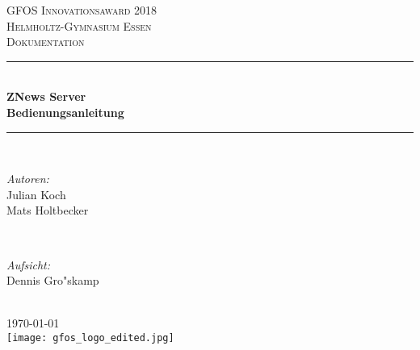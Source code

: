 \begin{titlepage}

    \newcommand{\HRule}{\rule{\linewidth}{0.5mm}} %

    \center %

    \textsc{\LARGE GFOS Innovationsaward 2018}\\[1.5cm]
    \textsc{\Large Helmholtz-Gymnasium Essen}\\[0.5cm]
    \textsc{\large Dokumentation}\\[0.5cm]

    \HRule \\[0.4cm]
    { \huge \bfseries ZNews Server\\ Bedienungsanleitung}\\[0.4cm]
    \HRule \\[1.5cm]

    \begin{minipage}{0.4\textwidth}
        \begin{flushleft}
            \large
            \emph{Autoren:}\\
            Julian Koch\\
            Mats Holtbecker
        \end{flushleft}
    \end{minipage}
    ~
    \begin{minipage}{0.4\textwidth}
        \begin{flushright}
            \large
            \emph{Aufsicht:} \\
            Dennis Gro"skamp\\
            \hfill
        \end{flushright}
    \end{minipage}\\[2cm]


    {\large \today}\\[2cm]

    \texttt{[image: gfos\_logo\_edited.jpg]}\\[1cm]


    \vfill

\end{titlepage}
